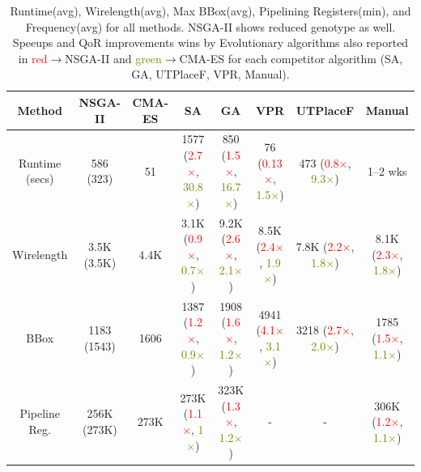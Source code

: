 \begin{table}[t]
	\caption{Runtime(avg), Wirelength(avg), Max BBox(avg), Pipelining
  Registers(min), and Frequency(avg) for all methods. NSGA-II shows reduced
genotype as well. Speeups and QoR improvements wins by Evolutionary algorithms
also reported in \textcolor{red}{red}$\rightarrow$NSGA-II and \textcolor{olive}{green}$\rightarrow$CMA-ES 
for each competitor algorithm (SA, GA, UTPlaceF, VPR, Manual).}	
	\label{table:comparison}
  \centering
  \begin{adjustbox}{width=1.1\textwidth,center}
  \begin{tabular}{c|c c| c c c c c}
	\toprule
  Method             & NSGA-II    	          & CMA-ES       & SA 					                                                                       & GA 			                                                                  & VPR     	                                                                & UTPlaceF 		                                                                   &  Manual \\
	\midrule
  Runtime (secs)     & 586 (323)		          & 51  		     &1577     (\textcolor{red}{2.7$\times$}, \textcolor{olive}{30.8$\times$})		        & 850 (\textcolor{red}{1.5$\times$}, \textcolor{olive}{16.7$\times$})		      & 76 (\textcolor{red}{0.13$\times$}, \textcolor{olive}{1.5$\times$})		    &  473 (\textcolor{red}{0.8$\times$}, \textcolor{olive}{9.3$\times$})            & 1--2 wks\\
  Wirelength  	     & 3.5K  (3.5K)   		    & 4.4K     		 &3.1K 	   (\textcolor{red}{0.9$\times$}, \textcolor{olive}{0.7$\times$})		          & 9.2K  (\textcolor{red}{2.6$\times$}, \textcolor{olive}{2.1$\times$})    		& 8.5K (\textcolor{red}{2.4$\times$}, \textcolor{olive}{1.9$\times$})   		&  7.8K  (\textcolor{red}{2.2$\times$}, \textcolor{olive}{1.8$\times$})          & 8.1K (\textcolor{red}{2.3$\times$}, \textcolor{olive}{1.8$\times$})  \\
  BBox      	       & 1183  (1543)   		    & 1606     		 &1387	   (\textcolor{red}{1.2$\times$}, \textcolor{olive}{0.9$\times$})		          & 1908  (\textcolor{red}{1.6$\times$}, \textcolor{olive}{1.2$\times$})   		  & 4941	(\textcolor{red}{4.1$\times$}, \textcolor{olive}{3.1$\times$})  		&   3218	(\textcolor{red}{2.7$\times$}, \textcolor{olive}{2.0$\times$})         & 1785 (\textcolor{red}{1.5$\times$}, \textcolor{olive}{1.1$\times$})  \\
  Pipeline Reg.		   & 256K  (273K) 		      & 273K	   		 &273K	   (\textcolor{red}{1.1$\times$}, \textcolor{olive}{1$\times$}) 	 	          & 323K	(\textcolor{red}{1.3$\times$}, \textcolor{olive}{1.2$\times$})   		  & -		                                                                      &   -                                                                            & 306K (\textcolor{red}{1.2$\times$}, \textcolor{olive}{1.1$\times$})   \\

\end{tabular}
\end{adjustbox}
\end{table}

